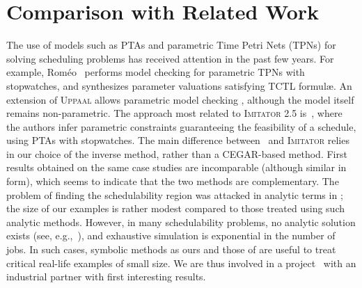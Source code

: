 \documentclass{llncs}
\newcommand{\hytech}{{\sc HyTech}}
\newcommand{\imitator}{\textsc{Imitator}}
\newcommand{\romeo}{Rom\'eo}
\newcommand{\trex}{\textsc{TReX}}
\newcommand{\uppaal}{\textsc{Uppaal}}
\newcommand{\commentaire}[1]{\textcolor{red}{\textbf{$\Leftarrow$  #1 $\Rightarrow$}}}
\begin{document}
\section{Comparison with Related Work}


The use of models such as PTAs and parametric Time Petri Nets (TPNs)
for solving scheduling problems has received attention in the past few years.
For example, \romeo{}~\cite{lrst09} performs 
model checking for parametric TPNs with stopwatches, and synthesizes parameter valuations satisfying TCTL formul\ae{}.
An extension of \uppaal{} allows parametric model checking \cite{BLR05formats}, although the model itself remains non-parametric.
%
%
The approach most related to \imitator{} 2.5 is~\mbox{\cite{cpr08,LPPRC10}}, where the authors infer parametric constraints guaranteeing the feasibility of a schedule, using PTAs with stopwatches.
The main difference between~\cite{cpr08,LPPRC10} and \imitator{} relies in our choice of the inverse method, rather than a CEGAR-based method.
First results obtained on the same case studies
are incomparable (although similar in form), which seems to indicate
that the two methods are complementary.
The problem of finding the schedulability region was attacked in analytic terms
in \cite{bb04};
the size of our examples is rather modest compared to those treated using such analytic methods.
However, in many schedulability problems,
no analytic solution exists (see, e.g.,~\cite{SGL97}), 
and exhaustive simulation is exponential
in the number of jobs. In such cases, symbolic methods as ours and those
of \cite{cpr08,LPPRC10}  are useful to treat
critical real-life examples of small size.
We are thus involved in a project~\cite{fl11} with an industrial partner 
with first interesting results.
\end{document}
